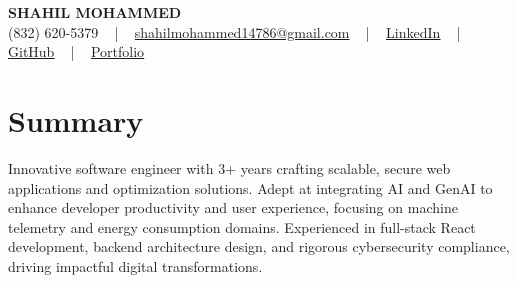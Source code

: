 \documentclass[letterpaper,10pt]{article}
\begin{document}
\begin{center}
    {\fontsize{14pt}{12pt}\selectfont \textbf{\MakeUppercase{Shahil Mohammed}}}\\ \vspace{2pt}
    \fontsize{10pt}{12pt}\selectfont (832) 620-5379 ~ | ~ \href{mailto:shahilmohammed14786@gmail.com}{shahilmohammed14786@gmail.com} ~ | ~  
    \href{https://www.linkedin.com/in/shahil-mohammed-9652931a1/}{\color{blue}\underline{LinkedIn}}  ~ | ~ 
    \href{https://github.com/freakbeast14}{\color{blue}\underline{GitHub}} ~ | ~ 
    \href{https://shahil-mohammed.netlify.app/}{\color{blue}\underline{Portfolio}}
    \vspace{-8pt}
\end{center}

\section{Summary}
\vspace{-2pt}\fontsize{8pt}{9pt}\selectfont
Innovative software engineer with 3+ years crafting scalable, secure web applications and optimization solutions. Adept at integrating AI and GenAI to enhance developer productivity and user experience, focusing on machine telemetry and energy consumption domains. Experienced in full-stack React development, backend architecture design, and rigorous cybersecurity compliance, driving impactful digital transformations.
 \vspace{-5pt}
 
\vspace{-2pt}
\end{document}
